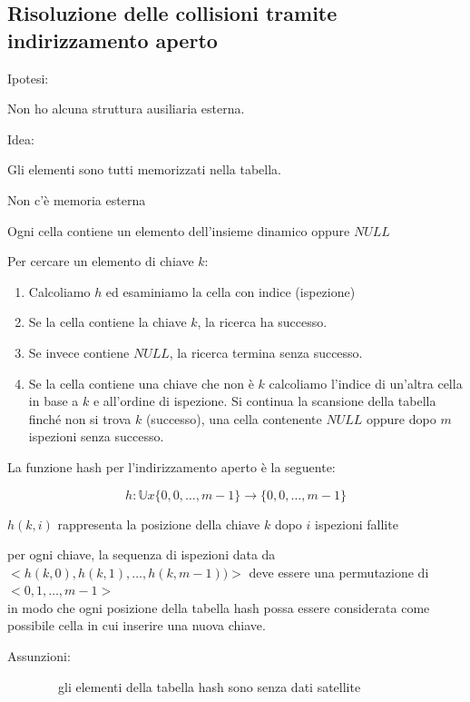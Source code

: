 \documentclass{article}
\providecommand{\tightlist}{%
  \setlength{\itemsep}{0pt}\setlength{\parskip}{0pt}}
\begin{document}
\subsection{Risoluzione delle collisioni tramite indirizzamento aperto}

{Ipotesi: }

{Non ho alcuna struttura ausiliaria esterna.}

{Idea:}

{Gli elementi sono tutti memorizzati nella tabella.}

{Non c'è memoria esterna}

{Ogni cella contiene un elemento dell'insieme dinamico oppure $NULL$}

{Per cercare un elemento di chiave $k$:}

\begin{enumerate}
\tightlist
\item
  {Calcoliamo $h$ ed esaminiamo la cella con indice (ispezione)}
\item
  {Se la cella contiene la chiave $k$, la ricerca ha successo. }
\item
  {Se invece contiene $NULL$, la ricerca termina senza successo.}
\item
  {Se la cella contiene una chiave che non è $k$ calcoliamo l'indice di un'altra cella in base a $k$ e all'ordine di ispezione. Si continua la scansione della tabella finché non si trova $k$ (successo), una cella contenente $NULL$ oppure dopo $m$ ispezioni senza successo.}
\end{enumerate}

{La funzione hash per l'indirizzamento aperto è la seguente:}

\begin{equation}
h:\mathbb{U}x\{0,0,\ldots,m-1\} \rightarrow \{0,0,\ldots,m-1\}
\end{equation}

{$h(k,i)$ rappresenta la posizione della chiave $k$ dopo $i$ ispezioni fallite}

{per ogni chiave, la sequenza di ispezioni data da \\
$<h(k,0),h(k,1),\ldots,h(k,m-1))>$ deve essere una permutazione di $<0,1,\ldots,m-1>$ \\ in modo che ogni posizione della tabella hash possa essere considerata come possibile cella in cui inserire una nuova chiave.}

{Assunzioni:}

{~~~~~~~~gli elementi della tabella hash sono senza dati satellite}
\end{document}
